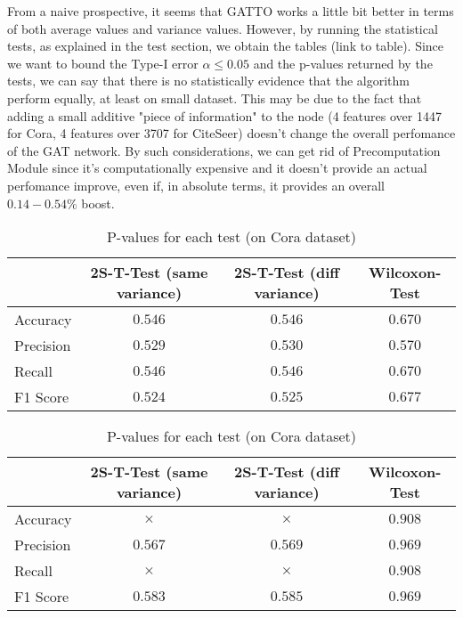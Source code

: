 \documentclass[12pt,conference]{ieeeconf} %
\begin{document}
From a naive prospective, it seems that GATTO works a little bit better in terms of both average values and variance values.
However, by running the statistical tests, as explained in the test section, we obtain the tables (link to table). Since we want to bound the Type-I error $\alpha \le 0.05$ and the p-values returned by the tests, we can say that there is no statistically evidence that the algorithm perform equally, at least on small dataset.
This may be due to the fact that adding a small additive "piece of information" to the node (4 features over 1447 for Cora, 4 features over 3707 for CiteSeer) doesn't change the overall perfomance of the GAT network. By such considerations, we can get rid of Precomputation Module since it's computationally expensive and it doesn't provide an actual perfomance improve, even if, in absolute terms, it provides an overall $0.14-0.54\%$ boost.

\begin{table*}[h!]
    \centering 
    \begin{tabular}{|l|c|c|c|} 
    \hline
     & 2S-T-Test (same variance) & 2S-T-Test (diff variance) & Wilcoxon-Test\\ \hline
    Accuracy &$0.546$ &$0.546$ &$0.670$ \\ \hline
    Precision &$0.529$ &$0.530$ &$0.570$\\ \hline
    Recall &$0.546$ &$0.546$ &$0.670$\\ \hline
    F1 Score &$0.524$ &$0.525$ &$0.677$\\ \hline
    \end{tabular}
    \caption{P-values for each test (on Cora dataset)}
\end{table*}

\begin{table*}[h!]
    \centering 
    \begin{tabular}{|l|c|c|c|} 
    \hline
     & 2S-T-Test (same variance) & 2S-T-Test (diff variance) & Wilcoxon-Test\\ \hline
    Accuracy &$\times$ &$\times$ &$0.908$ \\ \hline
    Precision &$0.567$ &$0.569$ &$0.969$\\ \hline
    Recall &$\times$ &$\times$ &$0.908$\\ \hline
    F1 Score &$0.583$ &$0.585$ &$0.969$\\ \hline
    \end{tabular}
    \caption{P-values for each test (on Cora dataset)}
\end{table*}
\end{document}

